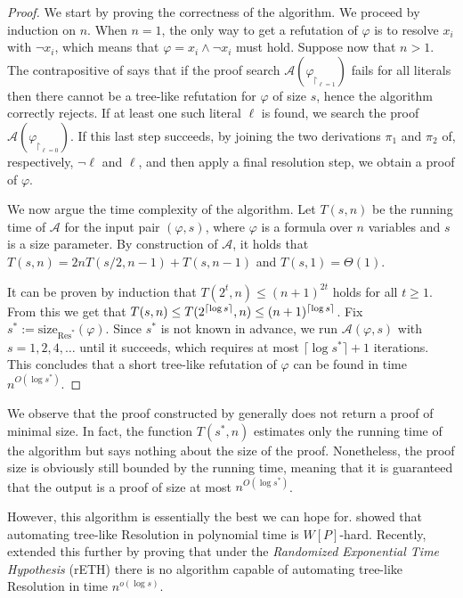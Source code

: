 \begin{proof}
    We start by proving the correctness of the algorithm. We proceed by induction on $n$. When $n = 1$, the only way to get a refutation of $\varphi$ is to resolve $x_i$ with $\lnot x_i$, which means that $\varphi = x_i \land \lnot x_i$ must hold. Suppose now that $n > 1$. The contrapositive of  says that if the proof search $\mathcal{A}(\varphi_{\upharpoonright_{\ell = 1}})$ fails for all literals then there cannot be a tree-like refutation for $\varphi$ of size $s$, hence the algorithm correctly rejects. If at least one such literal $\ell$ is found, we search the proof $\mathcal{A}(\varphi_{\upharpoonright_{\ell = 0}})$. If this last step succeeds, by joining the two derivations $\pi_1$ and $\pi_2$ of, respectively, $\lnot \ell$ and $\ell$, and then apply a final resolution step, we obtain a proof of $\varphi$.

    We now argue the time complexity of the algorithm. Let $T(s,n)$ be the running time of $\mathcal{A}$ for the input pair $(\varphi, s)$, where $\varphi$ is a formula over $n$ variables and $s$ is a size parameter. By construction of $\mathcal{A}$, it holds that $T(s,n) = 2nT(s/2, n-1) + T(s, n-1)$ and $T(s,1) = \Theta(1)$.

    It can be proven by induction that $T(2^t, n) \leq (n+1)^{2t}$ holds for all $t \geq 1$. From this we get that $T(s, n) \leq T(2^{\left \lceil \log s \right \rceil}, n) \leq (n+1)^{\left \lceil \log s \right \rceil}$. Fix $s^* := \mathrm{size}_{\mathrm{Res}^*}(\varphi)$. Since $s^*$ is not known in advance, we run $\mathcal{A}(\varphi, s)$ with $s = 1, 2, 4, \ldots$ until it succeeds, which requires at most $\lceil \log s^* \rceil + 1$ iterations. This concludes that a short tree-like refutation of $\varphi$ can be found in time $n^{O(\log s^*)}$.
\end{proof}

We observe that the proof constructed by  generally does not return a proof of minimal size. In fact, the function $T(s^*,n)$ estimates only the running time of the algorithm but says nothing about the size of the proof. Nonetheless, the proof size is obviously still bounded by the running time, meaning that it is guaranteed that the output is a proof of size at most $n^{O(\log s^*)}$.

However, this algorithm is essentially the best we can hope for. \textcite{res_wphard} showed that automating tree-like Resolution in polynomial time is $W[P]$-hard. Recently, \textcite{eth_hard_treeres} extended this further by proving that under the \textit{Randomized Exponential Time Hypothesis} (rETH) \cite{eth} there is no algorithm capable of automating tree-like Resolution in time $n^{o(\log s)}$.


